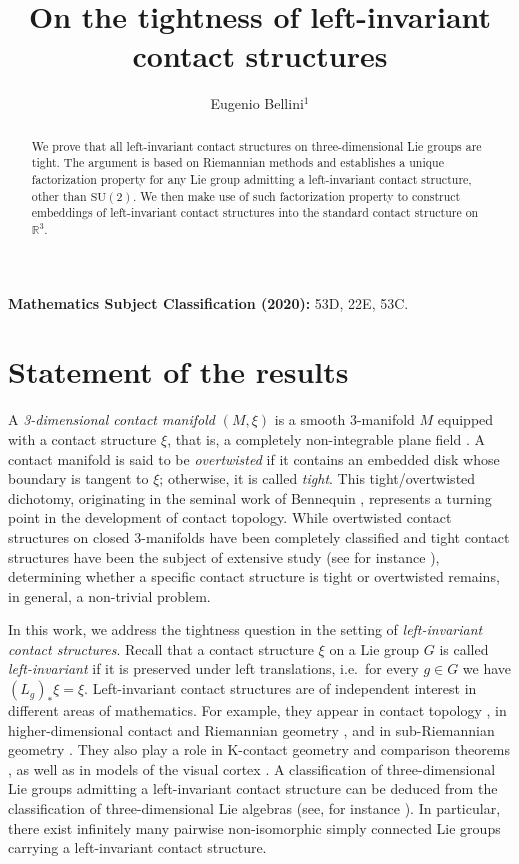 \documentclass[reqno]{amsart}
\title[]{On the tightness of left-invariant contact structures}
\author{Eugenio Bellini$^1$}
\theoremstyle{remark}
\theoremstyle{plain}
\begin{document}
\maketitle
\begin{abstract}
	We prove that all left-invariant contact structures on three-dimensional Lie groups are tight. The argument is based on Riemannian methods and establishes a unique factorization property for any Lie group admitting a left-invariant contact structure, other than $\mathrm{SU}(2)$. We then make use of such factorization property to construct embeddings of left-invariant contact structures into the standard contact structure on $\mathbb R^3$.
\end{abstract}
\medskip
\noindent\textbf{Mathematics Subject Classification (2020):}
53D, 22E, 53C.
\tableofcontents
\section{Statement of the results} 
A \emph{3-dimensional contact manifold} \((M,\xi)\) is a smooth \(3\)-manifold \(M\) equipped with a contact structure \(\xi\), that is, a completely non-integrable plane field \cite{Geiges,Massot-LectureNotes}. A contact manifold is said to be \emph{overtwisted} if it contains an embedded disk whose boundary is tangent to \(\xi\); otherwise, it is called \emph{tight}. This tight/overtwisted dichotomy, originating in the seminal work of Bennequin \cite{bennequin}, represents a turning point in the development of contact topology. While overtwisted contact structures on closed \(3\)-manifolds have been completely classified and tight contact structures have been the subject of extensive study (see for instance \cite{Eliashberg,Elia3,Eliashberg2,Elia4,giroux1,giroux2,HondaClass,VGK2003,SmallSeifert}), determining whether a specific contact structure is tight or overtwisted remains, in general, a non-trivial problem.  

In this work, we address the tightness question in the setting of \emph{left-invariant contact structures}. Recall that a contact structure \(\xi\) on a Lie group \(G\) is called \emph{left-invariant} if it is preserved under left translations, i.e.\ for every \(g \in G\) we have \((L_g)_*\xi = \xi\). Left-invariant contact structures are of independent interest in different areas of mathematics. For example, they appear in contact topology \cite{Geiges1997,Geiges1995}, in higher-dimensional contact and Riemannian geometry \cite{Diatta1,Diatta2}, and in sub-Riemannian geometry \cite{Barilari,Falbel,Boarotto2016}. They also play a role in K-contact geometry and comparison theorems \cite[Sec. 6.3]{ABBR}, as well as in models of the visual cortex \cite{Citti,Cortical_BCGPR}. A classification of three-dimensional Lie groups admitting a left-invariant contact structure can be deduced from the classification of three-dimensional Lie algebras (see, for instance \cite{Barilari}). In particular, there exist infinitely many pairwise non-isomorphic simply connected Lie groups carrying a left-invariant contact structure. 
\end{document}
